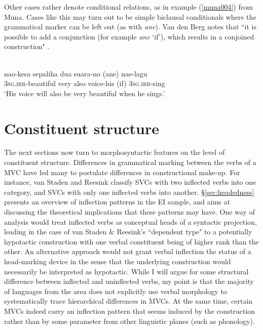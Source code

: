 Other cases rather denote conditional relations, as in example (\ref{muna004}) from Muna. Cases like this may turn out to be simple biclausal conditionals where the grammatical marker can be left out (as with \textit{ane}). Van den Berg notes that ``it is possible to add a conjunction (for example \textit{ane} `if'), which results in a conjoined construction" \citep[235]{vandenberg1989}.

\ea \label{muna004}
\\
\gll nao-kesa sepaliha dua suara-no (ane) nae-lagu \\
3\textsc{sg}.\textsc{irr}-beautiful very also voice-his (if) 3\textsc{sg}.\textsc{irr}-sing \\
\glft `His voice will also be very beautiful when he sings.'\\ 
\z

\section{Constituent structure}

The next sections now turn to morphosyntactic features on the level of constituent structure. Differences in grammatical marking between the verbs of a MVC have led many to postulate differences in constructional make-up. For instance, van Staden and Reesink classify SVCs with two inflected verbs into one category, and SVCs with only one inflected verbs into another. §\ref{sec:headedness} presents an overview of inflection patterns in the EI sample, and aims at discussing the theoretical implications that these patterns may have. One way of analysis would treat inflected verbs as conceptual heads of a syntactic projection, leading in the case of van Staden \& Reesink's ``dependent type" to a potentially hypotactic construction with one verbal constituent being of higher rank than the other. An alternative approach would not grant verbal inflection the status of a head-marking device in the sense that the underlying construction would necessarily be interpreted as hypotactic. While I will argue for some structural difference between inflected and uninflected verbs, my point is that the majority of languages from the area does not explicitly use verbal morphology to systematically trace hierarchical differences in MVCs. At the same time, certain MVCs indeed carry an inflection pattern that seems induced by the construction rather than by some parameter from other linguistic planes (such as phonology).

